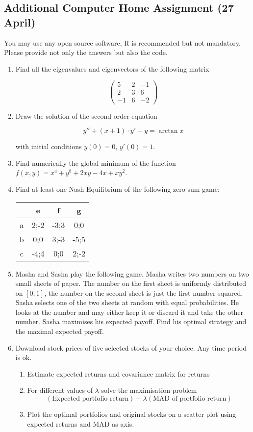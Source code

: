 \documentclass[a4paper]{article}
\begin{document}
\newpage
\subsection*{Additional Computer Home Assignment (27 April)}

You may use any open source software, R is recommended but not mandatory. Please provide not only the answers but also the code.

\begin{enumerate}

\item Find all the eigenvalues and eigenvectors of the following matrix

\[
\begin{pmatrix}
5 & 2 & -1\\
2 & 3 & 6\\
-1 & 6 & -2
\end{pmatrix}
\]

\item Draw the solution of the second order equation

\[
y''+(x+1)\cdot y' + y=\arctan x
\]

with initial conditions $y(0)=0$, $y'(0)=1$.

\item Find numerically the global minimum of the function $f(x,y)=x^4+y^8+2xy-4x+xy^2$.

\item Find at least one Nash Equilibrium of the following zero-sum game:

\begin{tabular}{c|ccc}
 & e & f & g \\
\hline
a & 2;-2 & -3;3 & 0;0 \\
b & 0;0 & 3;-3 & -5;5 \\
c & -4;4 & 0;0 & 2;-2 \\
\end{tabular}

\item Masha and Sasha play the following game. Masha writes two numbers on two small sheets of paper. The number on the first sheet is uniformly distributed on $[0;1]$, the number on the second sheet is just the first number squared. Sasha selects one of the two sheets at random with equal probabilities. He looks at the number and may either keep it or discard it and take the other number. Sasha maximises his expected payoff. Find his optimal strategy and the maximal expected payoff.

\item Download stock prices of five selected stocks of your choice. Any time period is ok.

\begin{enumerate}
\item Estimate expected returns and covariance matrix for returns
\item For different values of $\lambda$ solve the maximisation problem
\[
(\text{Expected portfolio return}) - \lambda (\text{MAD of portfolio return})
\]
\item Plot the optimal portfolios and original stocks on a scatter plot using expected returns and MAD as axis.
\end{enumerate}
\end{enumerate}
\end{document}
